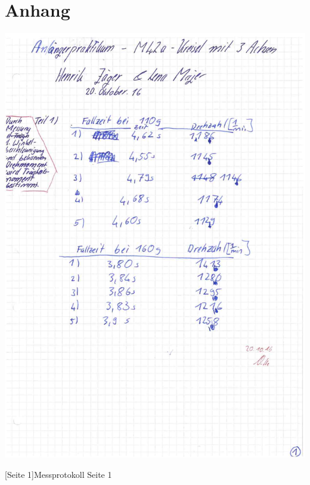 \documentclass[12pt,a4paper,]{scrreprt}
\begin{document}
	\chapter{Anhang}
    \begin{center}
    		\includegraphics[scale=0.32]{1.jpg}
    	\end{center}
    	[Seite 1]{Messprotokoll Seite 1}
    	\pagebreak
    	
\end{document}
